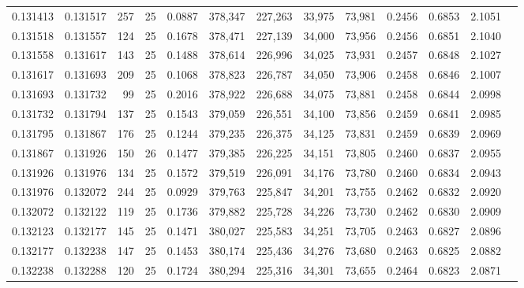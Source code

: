 \begin{tabular}{rrrrrrrrrrrrr}
0.131413 & 0.131517 &   257 &  25 &                                     0.0887 & 378,347 & 227,263 &  33,975 &  73,981 & 0.2456 & 0.6853 & 2.1051 \\
0.131518 & 0.131557 &   124 &  25 &                                     0.1678 & 378,471 & 227,139 &  34,000 &  73,956 & 0.2456 & 0.6851 & 2.1040 \\
0.131558 & 0.131617 &   143 &  25 &                                     0.1488 & 378,614 & 226,996 &  34,025 &  73,931 & 0.2457 & 0.6848 & 2.1027 \\
0.131617 & 0.131693 &   209 &  25 &                                     0.1068 & 378,823 & 226,787 &  34,050 &  73,906 & 0.2458 & 0.6846 & 2.1007 \\
0.131693 & 0.131732 &    99 &  25 &                                     0.2016 & 378,922 & 226,688 &  34,075 &  73,881 & 0.2458 & 0.6844 & 2.0998 \\
0.131732 & 0.131794 &   137 &  25 &                                     0.1543 & 379,059 & 226,551 &  34,100 &  73,856 & 0.2459 & 0.6841 & 2.0985 \\
0.131795 & 0.131867 &   176 &  25 &                                     0.1244 & 379,235 & 226,375 &  34,125 &  73,831 & 0.2459 & 0.6839 & 2.0969 \\
0.131867 & 0.131926 &   150 &  26 &                                     0.1477 & 379,385 & 226,225 &  34,151 &  73,805 & 0.2460 & 0.6837 & 2.0955 \\
0.131926 & 0.131976 &   134 &  25 &                                     0.1572 & 379,519 & 226,091 &  34,176 &  73,780 & 0.2460 & 0.6834 & 2.0943 \\
0.131976 & 0.132072 &   244 &  25 &                                     0.0929 & 379,763 & 225,847 &  34,201 &  73,755 & 0.2462 & 0.6832 & 2.0920 \\
0.132072 & 0.132122 &   119 &  25 &                                     0.1736 & 379,882 & 225,728 &  34,226 &  73,730 & 0.2462 & 0.6830 & 2.0909 \\
0.132123 & 0.132177 &   145 &  25 &                                     0.1471 & 380,027 & 225,583 &  34,251 &  73,705 & 0.2463 & 0.6827 & 2.0896 \\
0.132177 & 0.132238 &   147 &  25 &                                     0.1453 & 380,174 & 225,436 &  34,276 &  73,680 & 0.2463 & 0.6825 & 2.0882 \\
0.132238 & 0.132288 &   120 &  25 &                                     0.1724 & 380,294 & 225,316 &  34,301 &  73,655 & 0.2464 & 0.6823 & 2.0871 \\

\end{tabular}
